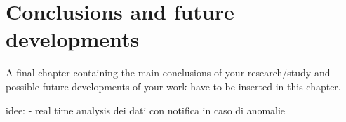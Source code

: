 \chapter{Conclusions and future developments}
\label{ch:conclusions}

A final chapter containing the main conclusions of your research/study
and possible future developments of your work have to be inserted in this chapter.

idee:
- real time analysis dei dati con notifica in caso di anomalie